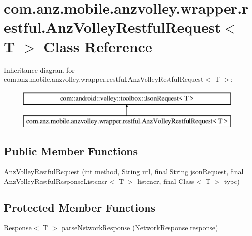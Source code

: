 \hypertarget{classcom_1_1anz_1_1mobile_1_1anzvolley_1_1wrapper_1_1restful_1_1_anz_volley_restful_request_3_01_t_01_4}{\section{com.\+anz.\+mobile.\+anzvolley.\+wrapper.\+restful.\+Anz\+Volley\+Restful\+Request$<$ T $>$ Class Reference}
\label{classcom_1_1anz_1_1mobile_1_1anzvolley_1_1wrapper_1_1restful_1_1_anz_volley_restful_request_3_01_t_01_4}
}
Inheritance diagram for com.\+anz.\+mobile.\+anzvolley.\+wrapper.\+restful.\+Anz\+Volley\+Restful\+Request$<$ T $>$\+:\begin{figure}[H]
\begin{center}
\leavevmode
\includegraphics[height=2.000000cm]{classcom_1_1anz_1_1mobile_1_1anzvolley_1_1wrapper_1_1restful_1_1_anz_volley_restful_request_3_01_t_01_4}
\end{center}
\end{figure}
\subsection*{Public Member Functions}
\begin{DoxyCompactItemize}
\item 
\hyperlink{classcom_1_1anz_1_1mobile_1_1anzvolley_1_1wrapper_1_1restful_1_1_anz_volley_restful_request_3_01_t_01_4_a5a8376c61d1b33df6d64be4c54f6164e}{Anz\+Volley\+Restful\+Request} (int method, String url, final String json\+Request, final Anz\+Volley\+Restful\+Response\+Listener$<$ T $>$ listener, final Class$<$ T $>$ type)
\end{DoxyCompactItemize}
\subsection*{Protected Member Functions}
\begin{DoxyCompactItemize}
\item 
Response$<$ T $>$ \hyperlink{classcom_1_1anz_1_1mobile_1_1anzvolley_1_1wrapper_1_1restful_1_1_anz_volley_restful_request_3_01_t_01_4_ab30c5f0fd98714a691c8c190c937f62a}{parse\+Network\+Response} (Network\+Response response)
\end{DoxyCompactItemize}


